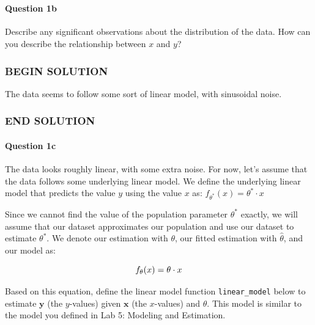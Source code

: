 \documentclass[11pt]{article}
\begin{document}
    \begin{center}
    \end{center}
    { \hspace*{\fill} \\}
    
    \paragraph{Question 1b}\label{question-1b}

Describe any significant observations about the distribution of the
data. How can you describe the relationship between \(x\) and \(y\)?

    \subsubsection{BEGIN SOLUTION}\label{begin-solution}

The data seems to follow some sort of linear model, with sinusoidal
noise.

\subsubsection{END SOLUTION}\label{end-solution}

    \paragraph{Question 1c}\label{question-1c}

The data looks roughly linear, with some extra noise. For now, let's
assume that the data follows some underlying linear model. We define the
underlying linear model that predicts the value \(y\) using the value
\(x\) as: \(f_{\theta^*}(x) = \theta^* \cdot x\)

Since we cannot find the value of the population parameter \(\theta^*\)
exactly, we will assume that our dataset approximates our population and
use our dataset to estimate \(\theta^*\). We denote our estimation with
\(\theta\), our fitted estimation with \(\hat{\theta}\), and our model
as:

\[\Large
f_{\theta}(x) = \theta \cdot x
\]

Based on this equation, define the linear model function
\texttt{linear\_model} below to estimate \(\textbf{y}\) (the
\(y\)-values) given \(\textbf{x}\) (the \(x\)-values) and \(\theta\).
This model is similar to the model you defined in Lab 5: Modeling and
Estimation.
\end{document}
